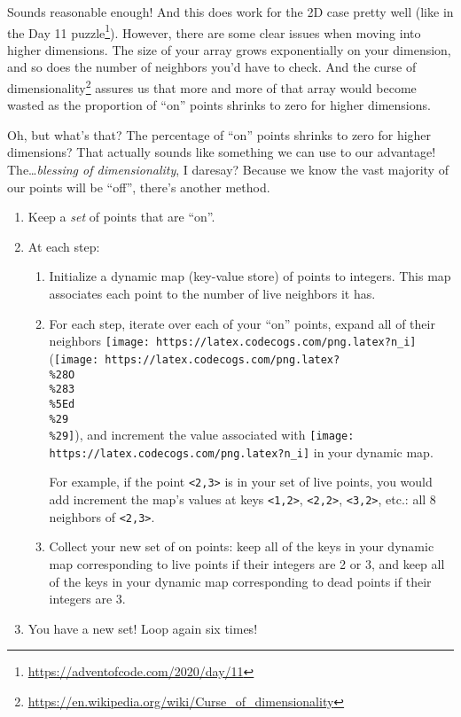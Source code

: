 \documentclass[]{article}
\renewcommand{\href}[2]{#2\footnote{\url{#1}}}
\begin{document}
Sounds reasonable enough! And this does work for the 2D case pretty well (like
in the \href{https://adventofcode.com/2020/day/11}{Day 11 puzzle}). However,
there are some clear issues when moving into higher dimensions. The size of your
array grows exponentially on your dimension, and so does the number of neighbors
you'd have to check. And the
\href{https://en.wikipedia.org/wiki/Curse_of_dimensionality}{curse of
dimensionality} assures us that more and more of that array would become wasted
as the proportion of ``on'' points shrinks to zero for higher dimensions.

Oh, but what's that? The percentage of ``on'' points shrinks to zero for higher
dimensions? That actually sounds like something we can use to our advantage!
The\ldots{}\emph{blessing of dimensionality}, I daresay? Because we know the
vast majority of our points will be ``off'', there's another method.

\begin{enumerate}
\def\labelenumi{\arabic{enumi}.}
\tightlist
\item
  Keep a \emph{set} of points that are ``on''.
\item
  At each step:

  \begin{enumerate}
  \def\labelenumii{\alph{enumii}.}
  \item
    Initialize a dynamic map (key-value store) of points to integers. This map
    associates each point to the number of live neighbors it has.
  \item
    For each step, iterate over each of your ``on'' points, expand all of their
    neighbors \texttt{[image: https://latex.codecogs.com/png.latex?n\_i]}
    (\texttt{[image: https://latex.codecogs.com/png.latex?\\\%28O\\\%283\\\%5Ed\\\%29\\\%29]}),
    and increment the value associated with
    \texttt{[image: https://latex.codecogs.com/png.latex?n\_i]} in your dynamic
    map.

    For example, if the point \texttt{\textless{}2,3\textgreater{}} is in your
    set of live points, you would add increment the map's values at keys
    \texttt{\textless{}1,2\textgreater{}},
    \texttt{\textless{}2,2\textgreater{}},
    \texttt{\textless{}3,2\textgreater{}}, etc.: all 8 neighbors of
    \texttt{\textless{}2,3\textgreater{}}.
  \item
    Collect your new set of on points: keep all of the keys in your dynamic map
    corresponding to live points if their integers are 2 or 3, and keep all of
    the keys in your dynamic map corresponding to dead points if their integers
    are 3.
  \end{enumerate}
\item
  You have a new set! Loop again six times!
\end{enumerate}
\end{document}
